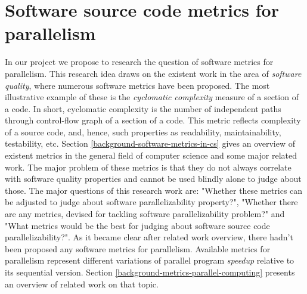 \section{Software source code metrics for parallelism}
\qquad In our project we propose to research the question of software metrics for parallelism. This research idea draws on the existent work in the area of \textit{software quality}, where numerous software metrics have been proposed. The most illustrative example of these is the \textit{cyclomatic complexity} measure of a section of a code. In short, cyclomatic complexity is the number of independent paths through control-flow graph of a section of a code. This metric reflects complexity of a source code, and, hence, such properties as readability, maintainability, testability, etc.\newline 
\null\qquad Section \ref{background-software-metrics-in-cs} gives an overview of existent metrics in the general field of computer science and some major related work. The major problem of these metrics is that they do not always correlate with software quality properties and cannot be used blindly alone to judge about those.\newline 
\null\qquad The major questions of this research work are: "Whether these metrics can be adjusted to judge about software parallelizability property?", "Whether there are any metrics, devised for tackling software parallelizability problem?" and "What metrics would be the best for judging about software source code parallelizability?".\newline
\null\qquad As it became clear after related work overview, there hadn't been proposed any software metrics for parallelism. Available metrics for parallelism represent different variations of parallel program \textit{speedup} relative to its sequential version. Section \ref{background-metrics-parallel-computing} presents an overview of related work on that topic.\newline

